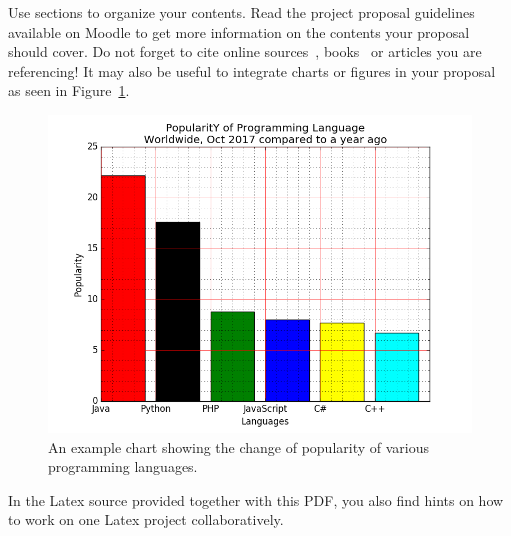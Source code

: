 \documentclass[
     12pt,         %
     a4paper,      %
     BCOR10mm,     %
     DIV14,        %
     ]{article}
\begin{document}
Use sections to organize your contents. Read the project proposal guidelines available on Moodle to get more information on the contents your proposal should cover. Do not forget to cite online sources~\cite{WFR2017}, books~\cite{goldberg2017neural} or articles you are referencing! It may also be useful to integrate charts or figures in your proposal as seen in Figure~\ref{fig:example}.

\begin{figure}[h]
  \centering
  \includegraphics[scale=0.3]{figures/example_barchart}
  \caption[]{An example chart showing the change of popularity of various programming languages\footnotemark[1].}
  \label{fig:example}
\end{figure}


In the Latex source provided together with this PDF, you also find hints on how to work on one Latex project collaboratively.




%
%
%





\end{document}
